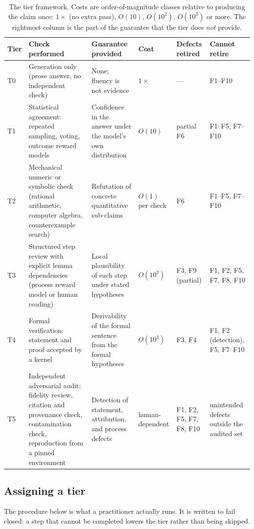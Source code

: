 \documentclass[11pt]{article}
\theoremstyle{plain}
\theoremstyle{definition}
\begin{document}
\begin{table}[t]
\centering
\small
\caption{The tier framework. Costs are order-of-magnitude classes relative to producing the
claim once: $1\times$ (no extra pass), $O(10)$, $O(10^{2})$, $O(10^{3})$ or more. The rightmost
column is the part of the guarantee that the tier does \emph{not} provide.}
\label{tab:tiers}
\begin{tabular}{@{}p{0.6cm}p{3.5cm}p{4.0cm}p{1.5cm}p{2.4cm}p{2.2cm}@{}}
\toprule
Tier & Check performed & Guarantee provided & Cost & Defects retired & Cannot retire \\
\midrule
T0 & Generation only (prose answer, no independent check) & None; fluency is not evidence
& $1\times$ & --- & F1--F10 \\
T1 & Statistical agreement: repeated sampling, voting, outcome reward models
& Confidence in the answer under the model's own distribution & $O(10)$ & partial F6
& F1--F5, F7--F10 \\
T2 & Mechanical numeric or symbolic check (rational arithmetic, computer algebra,
counterexample search) & Refutation of concrete quantitative sub-claims & $O(1)$ per check
& F6 & F1--F5, F7--F10 \\
T3 & Structured step review with explicit lemma dependencies (process reward model or human
reading) & Local plausibility of each step under stated hypotheses & $O(10^{2})$
& F3, F9 (partial) & F1, F2, F5, F7, F8, F10 \\
T4 & Formal verification: statement and proof accepted by a kernel & Derivability of the
formal sentence from the formal hypotheses & $O(10^{3})$ & F3, F4 & F1, F2 (detection),
F5, F7--F10 \\
T5 & Independent adversarial audit: fidelity review, citation and provenance check,
contamination check, reproduction from a pinned environment & Detection of statement,
attribution, and process defects & human-dependent & F1, F2, F5, F7, F8, F10
& unintended defects outside the audited set \\
\bottomrule
\end{tabular}
\end{table}

\subsection{Assigning a tier}

The procedure below is what a practitioner actually runs. It is written to fail closed: a
step that cannot be completed lowers the tier rather than being skipped.
\end{document}
